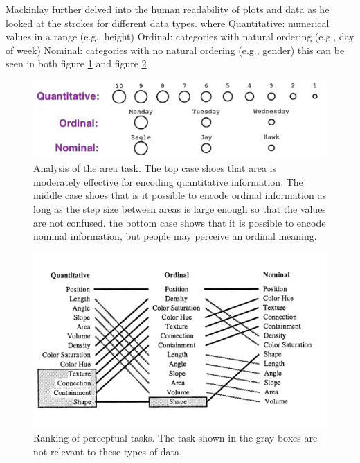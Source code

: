 \documentclass{article}
\begin{document}
\begin{flushleft}
Mackinlay further delved into the human readability of plots and data as he looked at the strokes for different data types. where Quantitative: numerical values in a range (e.g., height) Ordinal: categories with natural ordering (e.g., day of week) Nominal: categories with no natural ordering (e.g., gender) this can be seen in both figure \ref{fig:data_types_1} and figure \ref{fig:data_types_2}
\end{flushleft}
\begin{figure}[H]
    \centering
    \includegraphics[width=.75\textwidth]{data_types_1.png}
    \caption{Analysis of the area task. The top case shoes that area is moderately effective for encoding quantitative information. The middle case shoes that is it possible to encode ordinal information as long as the step size between areas is large enough so that the values are not confused. the bottom case shows that it is possible to encode nominal information, but people may perceive an ordinal meaning.}
    \label{fig:data_types_1}
\end{figure}
\begin{figure}[H]
    \centering
    \includegraphics[width=.75\textwidth]{data_types_2.png}
    \caption{Ranking of perceptual tasks. The task shown in the gray boxes are not relevant to these types of data.}
    \label{fig:data_types_2}
\end{figure}
\end{document}
